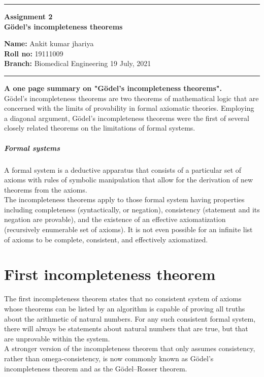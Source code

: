 \documentclass[10pt,a4paper,twoside]{article}
\begin{document}
\begin{center}
\hrule

\vspace{.3cm}
{\bf {\Large Assignment 2 }}\\
{\bf {\huge Gödel's incompleteness theorems}}
\vspace{.2cm}
\end{center}
{\bf Name:}  Ankit kumar jhariya\\
{\bf Roll no:}  19111009 \\
{\bf Branch: }  Biomedical Engineering \hspace{\fill}  19 July, 2021 \\
\hrule

\vspace{.4cm}
{\textbf{\large A one page summary on "Gödel's incompleteness theorems".}} \\

Gödel's incompleteness theorems are two theorems of mathematical logic that are concerned with the limits of provability in formal axiomatic theories. Employing a diagonal argument, Gödel's incompleteness theorems were the first of several closely related theorems on the limitations of formal systems.

\subparagraph{Formal systems}
A formal system is a deductive apparatus that consists of a particular set of axioms with rules of symbolic manipulation that allow for the derivation of new theorems from the axioms. \\
The incompleteness theorems apply to those formal system having properties including completeness (syntactically, or negation), consistency (statement and its negation are provable), and the existence of an effective axiomatization (recursively enumerable set of axioms). It is not even possible for an infinite list of axioms to be complete, consistent, and effectively axiomatized.

\section{First incompleteness theorem}
The first incompleteness theorem states that no consistent system of axioms whose theorems can be listed by an algorithm is capable of proving all truths about the arithmetic of natural numbers. For any such consistent formal system, there will always be statements about natural numbers that are true, but that are unprovable within the system.\\
A stronger version of the incompleteness theorem that only assumes consistency, rather than omega-consistency, is now commonly known as Gödel's incompleteness theorem and as the Gödel–Rosser theorem.
\end{document}
